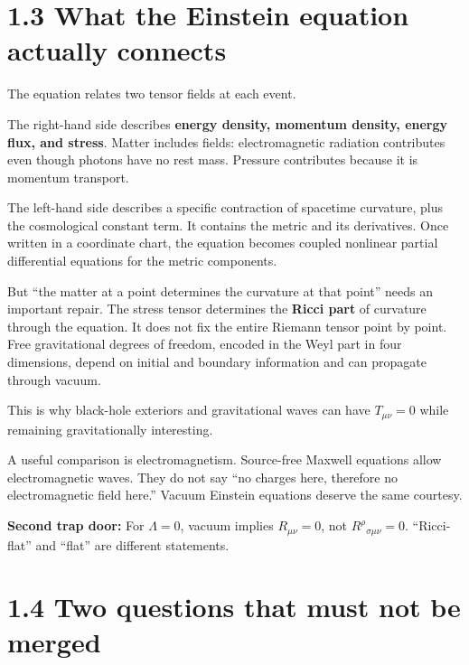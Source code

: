 \documentclass[
  11pt,
  letterpaper,
  oneside,
  openany]{scrbook}
\renewenvironment{quote}{\begin{tcolorbox}[enhanced,breakable,sharp corners,colback=pale,colframe=accent,boxrule=0pt,borderline west={2pt}{0pt}{accent},left=10pt,right=10pt,top=7pt,bottom=7pt]}{\end{tcolorbox}}
\begin{document}
\hypertarget{what-the-einstein-equation-actually-connects}{%
\section{1.3 What the Einstein equation actually
connects}\label{what-the-einstein-equation-actually-connects}}

The equation relates two tensor fields at each event.

The right-hand side describes \textbf{energy density, momentum density,
energy flux, and stress}. Matter includes fields: electromagnetic
radiation contributes even though photons have no rest mass. Pressure
contributes because it is momentum transport.

The left-hand side describes a specific contraction of spacetime
curvature, plus the cosmological constant term. It contains the metric
and its derivatives. Once written in a coordinate chart, the equation
becomes coupled nonlinear partial differential equations for the metric
components.

But ``the matter at a point determines the curvature at that point''
needs an important repair. The stress tensor determines the
\textbf{Ricci part} of curvature through the equation. It does not fix
the entire Riemann tensor point by point. Free gravitational degrees of
freedom, encoded in the Weyl part in four dimensions, depend on initial
and boundary information and can propagate through vacuum.

This is why black-hole exteriors and gravitational waves can have
\(T_{\mu\nu}=0\) while remaining gravitationally interesting.

A useful comparison is electromagnetism. Source-free Maxwell equations
allow electromagnetic waves. They do not say ``no charges here,
therefore no electromagnetic field here.'' Vacuum Einstein equations
deserve the same courtesy.

\begin{quote}
\textbf{Second trap door:} For \(\Lambda=0\), vacuum implies
\(R_{\mu\nu}=0\), not \(R^\rho{}_{\sigma\mu\nu}=0\). ``Ricci-flat'' and
``flat'' are different statements.
\end{quote}

\hypertarget{two-questions-that-must-not-be-merged}{%
\section{1.4 Two questions that must not be
merged}\label{two-questions-that-must-not-be-merged}}
\end{document}
